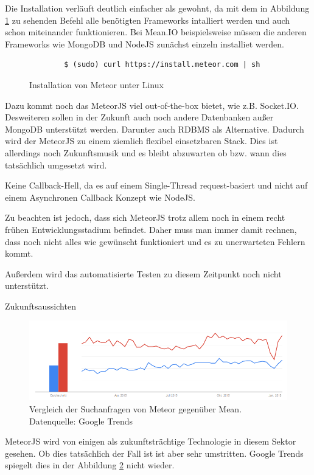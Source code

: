 Die Installation verläuft deutlich einfacher als gewohnt, da mit dem in Abbildung \ref{f:instMeteor} zu sehenden Befehl alle benötigten Frameworks intalliert werden und auch schon miteinander funktionieren. Bei Mean.IO beispielsweise müssen die anderen Frameworks wie MongoDB und NodeJS zunächst einzeln installiet werden.

\begin{figure}[h]
	\centering
	\begin{lstlisting}
		$ (sudo) curl https://install.meteor.com | sh
	\end{lstlisting}
	\caption[instMeteor]{Installation von Meteor unter Linux}
	\label{f:instMeteor}
\end{figure}

\cite{meteor:t3n}
	
Dazu kommt noch das MeteorJS viel out-of-the-box bietet, wie z.B. Socket.IO. Desweiteren sollen in der Zukunft auch noch andere Datenbanken außer MongoDB unterstützt werden. Darunter auch RDBMS als Alternative. Dadurch wird der MeteorJS zu einem ziemlich flexibel einsetzbaren Stack. Dies ist allerdings noch Zukunftsmusik und es bleibt abzuwarten ob bzw. wann dies tatsächlich umgesetzt wird.
	
Keine Callback-Hell, da es auf einem Single-Thread request-basiert und nicht auf einem Asynchronen Callback Konzept wie NodeJS.
	
Zu beachten ist jedoch, dass sich MeteorJS trotz allem noch in einem recht frühen Entwicklungsstadium befindet. Daher muss man immer damit rechnen, dass noch nicht alles wie gewünscht funktioniert und es zu unerwarteten Fehlern kommt.
	
Außerdem wird das automatisierte Testen zu diesem Zeitpunkt noch nicht unterstützt.

Zukunftsaussichten

\begin{figure}[h]
	\centering
	\includegraphics[width=0.7\linewidth]{figures/meteor-vs-mean.png}
	\caption{Vergleich der Suchanfragen von Meteor gegenüber Mean. Datenquelle: Google Trends \cite{googleTrends:meteorVsMean}}
	\label{f:mean-frameworks:meteorVsMean}
\end{figure}

MeteorJS wird von einigen als zukunftsträchtige Technologie in diesem Sektor gesehen.
Ob dies tatsächlich der Fall ist ist aber sehr umstritten.
Google Trends spiegelt dies in der Abbildung \ref{f:mean-frameworks:meteorVsMean} nicht wieder.